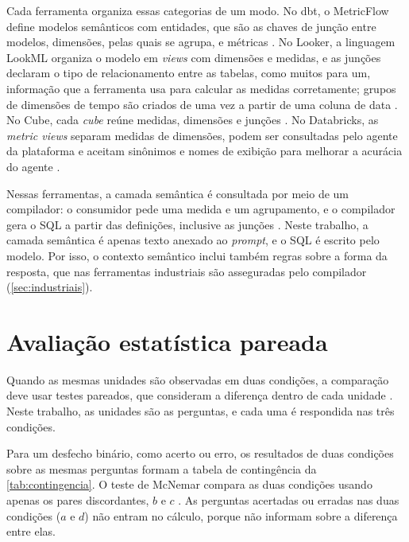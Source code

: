 Cada ferramenta organiza essas categorias de um modo. No dbt, o
MetricFlow define modelos semânticos com entidades, que são as chaves de
junção entre modelos, dimensões, pelas quais se agrupa, e métricas
\cite{dbt_metricflow}. No Looker, a linguagem LookML organiza o modelo em
\textit{views} com dimensões e medidas, e as junções declaram o tipo de
relacionamento entre as tabelas, como muitos para um, informação que a
ferramenta usa para calcular as medidas corretamente; grupos de dimensões
de tempo são criados de uma vez a partir de uma coluna de data
\cite{looker_lookml,looker_relationship,looker_dimgroup}. No Cube, cada \textit{cube} reúne medidas,
dimensões e junções \cite{cube_datamodel}. No Databricks, as
\textit{metric views} separam medidas de dimensões, podem ser consultadas
pelo agente da plataforma e aceitam sinônimos e nomes de exibição para
melhorar a acurácia do agente \cite{databricks_metricviews}.

Nessas ferramentas, a camada semântica é consultada por meio de um
compilador: o consumidor pede uma medida e um agrupamento, e o compilador
gera o SQL a partir das definições, inclusive as junções
\cite{dbt_slarchitecture,dbt_metricflow,looker_lookml,cube_datamodel}.
Neste trabalho, a camada semântica é apenas texto anexado ao
\textit{prompt}, e o SQL é escrito pelo modelo. Por isso, o contexto
semântico inclui também regras sobre a forma da resposta, que nas
ferramentas industriais são asseguradas pelo compilador
(\autoref{sec:industriais}).

\section{Avaliação estatística pareada}
\label{sec:estatistica}

Quando as mesmas unidades são observadas em duas condições, a comparação
deve usar testes pareados, que consideram a diferença dentro de cada
unidade \cite{agresti2013categorical}. Neste trabalho, as unidades são as
perguntas, e cada uma é respondida nas três condições.

Para um desfecho binário, como acerto ou erro, os resultados de duas
condições sobre as mesmas perguntas formam a tabela de contingência da
\autoref{tab:contingencia}. O teste de McNemar compara as duas condições
usando apenas os pares discordantes, $b$ e $c$ \cite{mcnemar1947note}.
As perguntas acertadas ou erradas nas duas condições ($a$ e $d$) não
entram no cálculo, porque não informam sobre a diferença entre elas.

